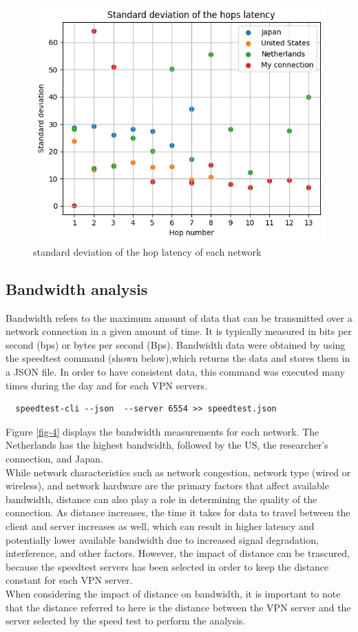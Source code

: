 \documentclass[eng]{class}
\begin{document}
\begin{figure}[H]
    \centering
    \includegraphics[width=.7\columnwidth]{images/varLHops.png}
    \caption{standard deviation of the hop latency of each network}
    \label{fig-3}
\end{figure}

\subsection{Bandwidth analysis}
Bandwidth refers to the maximum amount of data that can be transmitted over a network connection in a given amount of time.
It is typically measured in bits per second (bps) or bytes per second (Bps).
Bandwidth data were obtained by using the speedtest command (shown below),which returns the data and stores them in a JSON file.
In order to have consistent data, this command was executed many times during the day and for each VPN servers.
\begin{lstlisting}
  speedtest-cli --json  --server 6554 >> speedtest.json
\end{lstlisting}
Figure \ref*{fig-4} displays the bandwidth measurements for each network.
The Netherlands has the highest bandwidth, followed by the US, the researcher's connection, and Japan.\\
While network characteristics such as network congestion, network type (wired or wireless),
and network hardware are the primary factors that affect available bandwidth, distance can also play a role in determining the quality of the connection.
As distance increases, the time it takes for data to travel between the client and server increases as well,
which can result in higher latency and potentially lower available bandwidth due to increased signal degradation, interference, and other factors.
However, the impact of distance can be trascured, because the speedtest servers has been selected in order to keep the distance constant for each VPN server.\\
When considering the impact of distance on bandwidth, it is important to note that the distance referred to here is the distance between the VPN server and
the server selected by the speed test to perform the analysis.
\end{document}
